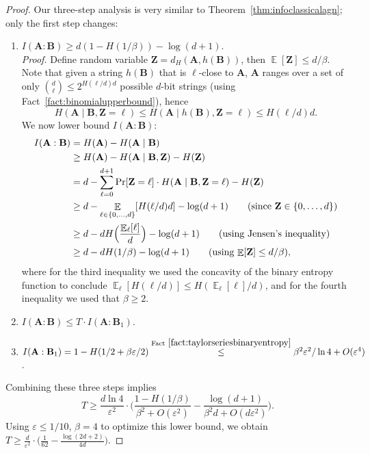 \documentclass[twoside,11pt]{article}
\newcommand{\eps}{\varepsilon}
\DeclareMathOperator*{\Ex}{\mathbb{E}}
\begin{document}
\begin{proof}
	Our three-step analysis is very similar to Theorem~\ref{thm:infoclassicalagn};
	only the first step changes:
	\begin{enumerate}
		\item $I(\mathbf{A}:\mathbf{B})\geq d(1-H(1/\beta))-\log (d+1)$. \\[2mm]
		\emph{Proof.} Define random variable $\mathbf{Z}=d_H(\mathbf{A},h(\mathbf{B}))$,
		then $\Ex[\mathbf{Z}]\leq d/\beta$. Note that given a string $h(\mathbf{B})$ that is $\ell$-close to $\mathbf{A}$, $\mathbf{A}$ ranges over a set of only ${d\choose \ell}\leq 2^{H(\ell/d)d}$ possible $d$-bit strings (using Fact~\ref{fact:binomialupperbound}), hence 
		$$
		H(\mathbf{A}\mid\mathbf{B},\mathbf{Z}=\ell)\leq H(\mathbf{A}\mid h(\mathbf{B}),\mathbf{Z}=\ell)\leq H(\ell/d)d.
		$$ We now lower bound $I(\mathbf{A}:\mathbf{B})$:
		\begin{align*}
		I(\mathbf{A}:\mathbf{B}) & = H(\mathbf{A})-H(\mathbf{A}\mid\mathbf{B})\\
		&  \geq H(\mathbf{A})-H(\mathbf{A}\mid \mathbf{B},\mathbf{Z})-H(\mathbf{Z})\\ 
		& = d-\sum_{\ell=0}^{d+1} \Pr[\mathbf{Z}=\ell]\cdot H(\mathbf{A}\mid \mathbf{B},\mathbf{Z}=\ell)- H(\mathbf{Z})\\
		& \geq d-\Ex_{\ell\in \{0,\ldots,d\}} [H(\ell/d)d]-\log (d+1) \tag{since $\mathbf{Z}\in \{0,\ldots,d\}$}\\
		& \geq d-d H\Big(\frac{\Ex_{\ell} [\ell]}{d}\Big) -\log (d+1)\tag{using Jensen's inequality}\\
		& \geq d-dH(1/\beta)-\log (d+1) \tag{using $\Ex[\mathbf{Z}]\leq d/\beta$},
		\end{align*}
		where for the third inequality we used the concavity of the binary entropy function to conclude $\Ex_\ell [H(\ell/d)]\leq H(\Ex_\ell [\ell]/d)$, and for the fourth inequality we used that $\beta\geq 2$. 
		\item $I(\mathbf{A}:\mathbf{B})\leq T\cdot I(\mathbf{A}:\mathbf{B}_1)$.
		\item $I(\mathbf{A}:\mathbf{B}_1)=1-H(1/2+\beta\eps/2)\stackrel{\text{Fact}~\ref{fact:taylorseriesbinaryentropy}}{\leq} \beta^2\eps^2/\ln 4+O(\eps^4)$.
	\end{enumerate}
	Combining these three steps implies  
	$$
	T\geq \frac{d\ln 4}{\eps^2} \cdot  \Big( \frac{1-H(1/\beta)}{\beta^2+O(\eps^2)}-\frac{\log(d+1)}{\beta^2d+O(d\eps^2)}\Big).
	$$
	Using $\eps\leq 1/10$, $\beta=4$ to optimize this lower bound, we obtain~$T\geq \frac{d}{\eps^2}\cdot \Big( \frac{1}{62}-\frac{\log(2d+2)}{4d}\Big)$.
\end{proof}
\end{document}
